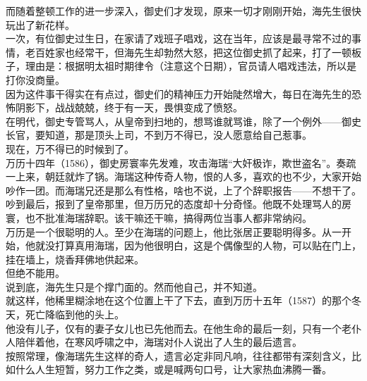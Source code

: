 \begin{multicols}{\theparacolNo}
而随着整顿工作的进一步深入，御史们才发现，原来一切才刚刚开始，海先生很快玩出了新花样。\\

一次，有位御史过生日，在家请了戏班子唱戏，这在当年，应该是最寻常不过的事情，老百姓家也经常干，但海先生却勃然大怒，把这位御史抓了起来，打了一顿板子，理由是：根据明太祖时期律令（注意这个日期），官员请人唱戏违法，所以是打你没商量。\\

因为这件事干得实在有点过，御史们的精神压力开始陡然增大，每日在海先生的恐怖阴影下，战战兢兢，终于有一天，畏惧变成了愤怒。\\

在明代，御史专管骂人，从皇帝到扫地的，想骂谁就骂谁，除了一个例外——御史长官，要知道，那是顶头上司，不到万不得已，没人愿意给自己惹事。\\

现在，万不得已的时候到了。\\

万历十四年（1586），御史房寰率先发难，攻击海瑞“大奸极诈，欺世盗名”。奏疏一上来，朝廷就炸了锅。海瑞这种传奇人物，恨的人多，喜欢的也不少，大家开始吵作一团。而海瑞兄还是那么有性格，啥也不说，上了个辞职报告——不想干了。\\

吵到最后，报到了皇帝那里，但万历兄的态度却十分奇怪。他既不处理骂人的房寰，也不批准海瑞辞职。该干嘛还干嘛，搞得两位当事人都非常纳闷。\\

万历是一个很聪明的人。至少在海瑞的问题上，他比张居正要聪明得多。从一开始，他就没打算真用海瑞，因为他很明白，这是个偶像型的人物，可以贴在门上，挂在墙上，烧香拜佛地供起来。\\

但绝不能用。\\

说到底，海先生只是个撑门面的。然而他自己，并不知道。\\

就这样，他稀里糊涂地在这个位置上干了下去，直到万历十五年（1587）的那个冬天，死亡降临到他的头上。\\

他没有儿子，仅有的妻子女儿也已先他而去。在他生命的最后一刻，只有一个老仆人陪伴着他，在寒风呼啸之中，海瑞对仆人说出了人生的最后遗言。\\

按照常理，像海瑞先生这样的奇人，遗言必定非同凡响，往往都带有深刻含义，比如什么人生短暂，努力工作之类，或是喊两句口号，让大家热血沸腾一番。\\


\end{multicols}
